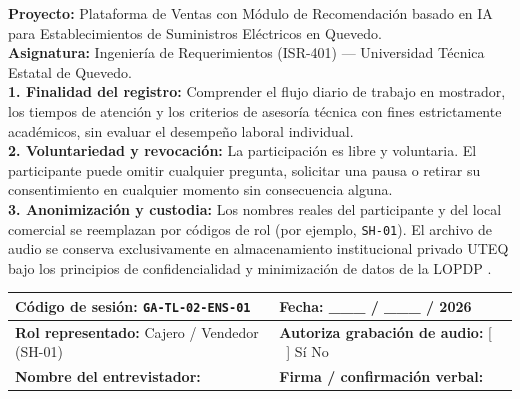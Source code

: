 \begin{tcolorbox}[colback=boxbg,colframe=midblue,boxrule=0.8pt,arc=2mm,breakable,title={\textbf{Plantilla de Consentimiento Informado para Registro de Audio (ACTA-CONS-01)}}]
\textbf{Proyecto:} Plataforma de Ventas con M\'odulo de Recomendaci\'on basado en IA para Establecimientos de Suministros El\'ectricos en Quevedo.\\
\textbf{Asignatura:} Ingenier\'ia de Requerimientos (ISR-401) --- Universidad T\'ecnica Estatal de Quevedo.\\[4pt]
\textbf{1. Finalidad del registro:} Comprender el flujo diario de trabajo en mostrador, los tiempos de atenci\'on y los criterios de asesor\'ia t\'ecnica con fines estrictamente acad\'emicos, sin evaluar el desempe\~no laboral individual.\\[3pt]
\textbf{2. Voluntariedad y revocaci\'on:} La participaci\'on es libre y voluntaria. El participante puede omitir cualquier pregunta, solicitar una pausa o retirar su consentimiento en cualquier momento sin consecuencia alguna.\\[3pt]
\textbf{3. Anonimizaci\'on y custodia:} Los nombres reales del participante y del local comercial se reemplazan por c\'odigos de rol (por ejemplo, \texttt{SH-01}). El archivo de audio se conserva exclusivamente en almacenamiento institucional privado UTEQ bajo los principios de confidencialidad y minimizaci\'on de datos de la LOPDP \cite{lopdp2021}.\\[6pt]
\noindent\begin{tabularx}{\linewidth}{|Y|Y|}
\hline
\textbf{C\'odigo de sesi\'on:} \texttt{GA-TL-02-ENS-01} & \textbf{Fecha:} \_\_\_ / \_\_\_ / 2026\\
\hline
\textbf{Rol representado:} Cajero / Vendedor (SH-01) & \textbf{Autoriza grabaci\'on de audio:} [ \ ] S\'i \quad [ \ ] No\\
\hline
\textbf{Nombre del entrevistador:} \rule{0pt}{14pt} & \textbf{Firma / confirmaci\'on verbal:} \rule{0pt}{14pt}\\
\hline
\end{tabularx}
\end{tcolorbox}
